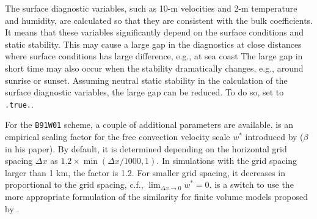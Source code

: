 The surface diagnostic variables, such as 10-m velocities and 2-m temperature and humidity, are calculated so that they are consistent with the bulk coefficients.
It means that these variables significantly depend on the surface conditions and static stability.
This may cause a large gap in the diagnostics at close distances where surface conditions has large difference, e.g., at sea coast
The large gap in short time may also occur when the stability dramatically changes, e.g., around sunrise or sunset.
Assuming neutral static stability in the calculation of the surface diagnostic variables, the large gap can be reduced.
To do so, set  to \verb|.true.|.


For the \verb|B91W01| scheme, a couple of additional parameters are available.
 is an empirical scaling factor for the free convection velocity scale $w^*$ introduced by \citet{beljaars_1994} ($\beta$ in his paper).
By default, it is determined depending on the horizontal grid spacing $\Delta x$ as $1.2 \times \min(\Delta x/1000, 1)$.
In simulations with the grid spacing larger than 1 km, the factor is 1.2.
For smaller grid spacing, it decreases in proportional to the grid spacing, c.f., $\lim_{\Delta x \to 0} w^* = 0$.
 is a switch to use the more appropriate formulation of the similarity for finite volume models proposed by \citet{nishizawa_2018}.
